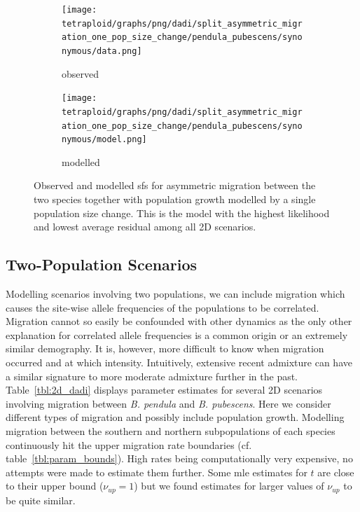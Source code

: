 \documentclass[hidelinks,11pt]{article}
\newcommand{\pendula}{\textit{B. pendula}}
\newcommand{\pubescens}{\textit{B. pubescens}}
\begin{document}
    \begin{figure}[H]
        \centering
        \begin{subfigure}[b]{0.49\textwidth}
            \texttt{[image: tetraploid/graphs/png/dadi/split\_asymmetric\_migration\_one\_pop\_size\_change/pendula\_pubescens/synonymous/data.png]}
            \caption{observed}
            \label{fig:constant_pop_size_since_ice_age}
        \end{subfigure}
        \hfill
        \begin{subfigure}[b]{0.49\textwidth}
            \texttt{[image: tetraploid/graphs/png/dadi/split\_asymmetric\_migration\_one\_pop\_size\_change/pendula\_pubescens/synonymous/model.png]}
            \caption{modelled}
            \label{fig:one_pop_size_change_since_ice_age}
        \end{subfigure}
        \caption{Observed and modelled \acrshort{sfs} for asymmetric migration between the two species together with population growth modelled by a single population size change. This is the model with the highest likelihood and lowest average residual among all 2D scenarios.}
        \label{fig:dadi_sfs_best_fixed_time_model}
    \end{figure}

    \subsection{Two-Population Scenarios}

    Modelling scenarios involving two populations, we can include migration which causes the site-wise allele frequencies of the populations to be correlated. Migration cannot so easily be confounded with other dynamics as the only other explanation for correlated allele frequencies is a common origin or an extremely similar demography. It is, however, more difficult to know when migration occurred and at which intensity. Intuitively, extensive recent admixture can have a similar signature to more moderate admixture further in the past. Table~\ref{tbl:2d_dadi} displays parameter estimates for several 2D scenarios involving migration between \pendula{} and \pubescens{}. Here we consider different types of migration and possibly include population growth. Modelling migration between the southern and northern subpopulations of each species continuously hit the upper migration rate boundaries (cf. table~\ref{tbl:param_bounds}). High rates being computationally very expensive, no attempts were made to estimate them further. Some \acrshort{mle} estimates for $t$ are close to their upper bound ($\nu_{up} = 1$) but we found estimates for larger values of $\nu_{up}$ to be quite similar.
\end{document}
